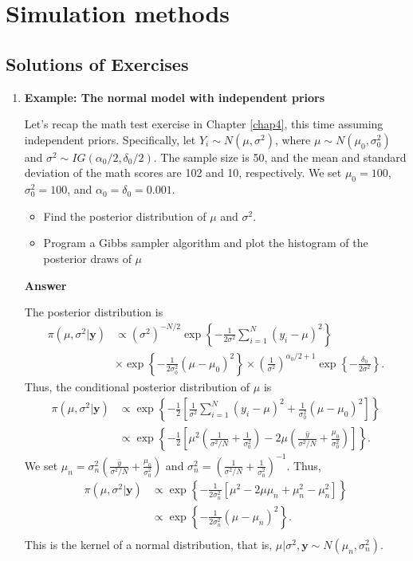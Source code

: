 \chapter{Simulation methods}\label{chap5}

\section*{Solutions of Exercises}\label{sec51}
\begin{enumerate}[leftmargin=*]
\item \textbf{Example: The normal model with independent priors}

Let's recap the math test exercise in Chapter \ref{chap4}, this time assuming independent priors. Specifically, let $Y_i \sim N(\mu, \sigma^2)$, where $\mu \sim N(\mu_0, \sigma_0^2)$ and $\sigma^2 \sim IG(\alpha_0 / 2, \delta_0 / 2)$. The sample size is 50, and the mean and standard deviation of the math scores are 102 and 10, respectively. We set $\mu_0 = 100$, $\sigma_0^2 = 100$, and $\alpha_0 = \delta_0 = 0.001$.

\begin{itemize}
	\item Find the posterior distribution of $\mu$ and $\sigma^2$.
	\item Program a Gibbs sampler algorithm and plot the histogram of the posterior draws of $\mu$
\end{itemize}

\textbf{Answer}

The posterior distribution is
\begin{align*}
	\pi(\mu,\sigma^2|\bm{y})&\propto (\sigma^2)^{-N/2}\exp\left\{-\frac{1}{2\sigma^2}\sum_{i=1}^N(y_i-\mu)^2\right\}\\
	&\times \exp\left\{-\frac{1}{2\sigma^2_0}(\mu-\mu_0)^2\right\}\times \left(\frac{1}{\sigma^2}\right)^{\alpha_0/2+1}\exp\left\{-\frac{\delta_0}{2\sigma^2}\right\}.
\end{align*}
Thus, the conditional posterior distribution of $\mu$ is
\begin{align*}
	\pi(\mu,\sigma^2|\bm{y})&\propto \exp\left\{-\frac{1}{2}\left[\frac{1}{\sigma^2}\sum_{i=1}^N(y_i-\mu)^2+\frac{1}{\sigma^2_0}(\mu-\mu_0)^2\right]\right\}\\
	&\propto \exp\left\{-\frac{1}{2}\left[\mu^2\left(\frac{1}{\sigma^2/N}+\frac{1}{\sigma^2_0}\right)-2\mu\left(\frac{\bar{y}}{\sigma^2/N}+\frac{\mu_0}{\sigma_0^2}\right)\right]\right\}.  
\end{align*} 
We set $\mu_n=\sigma^{2}_n\left(\frac{\bar{y}}{\sigma^2/N}+\frac{\mu_0}{\sigma_0^2}\right)$ and $\sigma^{2}_n=\left(\frac{1}{\sigma^2/N}+\frac{1}{\sigma_0^2}\right)^{-1}$. Thus,
\begin{align*}
	\pi(\mu,\sigma^2|\bm{y})&\propto \exp\left\{-\frac{1}{2\sigma_n^2}\left[\mu^2-2\mu\mu_n+\mu_n^2-\mu_n^2\right]\right\}\\
	&\propto \exp\left\{-\frac{1}{2\sigma_n^2}(\mu-\mu_n)^2\right\}.\\  
\end{align*} 
This is the kernel of a normal distribution, that is, $\mu|\sigma^2,\bm{y}\sim N(\mu_n,\sigma_n^2)$.


\end{enumerate}
